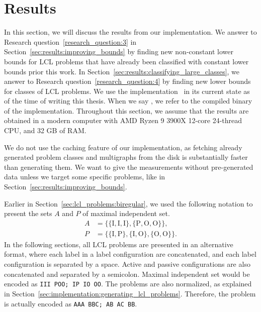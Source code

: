 
\section{Results} \label{sec:results}

\lstset{
  basicstyle=\ttfamily,
  mathescape,
  columns=fixed,
  fontadjust=true,
  basewidth=0.5em
}


In this section, we will discuss the results from our implementation.
We answer to Research question~\ref{research_question:3} in Section~\ref{sec:results:improving_bounds} by finding new non-constant lower bounds for LCL problems that have already been classified with constant lower bounds prior this work.
In Section~\ref{sec:results:classifying_large_classes}, we answer to Research question~\ref{research_question:4} by finding new lower bounds for classes of LCL problems.
We use the implementation~\cite[commit ]{NonconstantLclClassifier2022} in its current state as of the time of writing this thesis.
When we say , we refer to the compiled binary of the implementation.
Throughout this section, we assume that the results are obtained in a modern computer with AMD Ryzen 9 3900X 12-core 24-thread CPU, and 32 GB of RAM.

We do not use the caching feature of our implementation, as fetching already generated problem classes and multigraphs from the disk is substantially faster than generating them.
We want to give the measurements without pre-generated data unless we target some specific problems, like in Section~\ref{sec:results:improving_bounds}.

Earlier in Section~\ref{sec:lcl_problems:biregular}, we used the following notation to present the sets $A$ and $P$ of maximal independent set.
\begin{align*}
    A &= \mathrm{\{\{I,I,I\},\{P,O,O\}\}}, \\
    P &= \mathrm{\{\{I,P\},\{I,O\},\{O,O\}\}}.
  \end{align*}
In the following sections, all LCL problems are presented in an alternative format, where each label in a label configuration are concatenated, and each label configuration is separated by a space.
Active and passive configurations are also concatenated and separated by a semicolon.
Maximal independent set would be encoded as
\lstinline{III POO; IP IO OO}.
The problems are also normalized, as explained in Section~\ref{sec:implementation:generating_lcl_problems}.
Therefore, the problem is actually encoded as \lstinline{AAA BBC; AB AC BB}.


